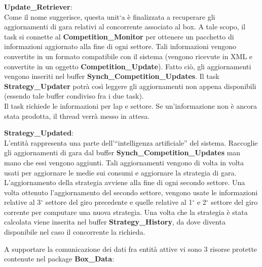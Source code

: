 \begin{description}
\item{\textbf{Update\_Retriever}}:\\
Come il nome suggerisce, questa unit`{a} \`{e} finalizzata a recuperare gli aggiornamenti di gara relativi al concorrente associato al box.
A tale scopo, il task si connette al \textbf{Competition\_Monitor} per ottenere un pacchetto di informazioni aggiornato alla fine di ogni 
settore. Tali informazioni vengono convertite in un formato compatibile con il sistema (vengono ricevute in XML e convertite in un oggetto
\textbf{Competition\_Update}). Fatto ci\`{o}, gli aggiornamenti vengono inseriti nel buffer \textbf{Synch\_Competition\_Updates}. Il task
\textbf{Strategy\_Updater} potr\`{a} cos\`{i} leggere gli aggiornamenti non appena disponibili (essendo tale buffer condiviso fra i due task).\\
Il task richiede le informazioni per lap e settore. Se un'informazione non \`{e} ancora stata prodotta, il thread verr\`{a} messo in attesa.
\item{\textbf{Strategy\_Updated}}:\\
L'entit\`{a} rappresenta una parte dell'``intelligenza artificiale'' del sistema. Raccoglie gli aggiornamenti di gara dal buffer \textbf{Synch\_Competition\_Updates}
man mano che essi vengono aggiunti. Tali aggiornamenti vengono di volta in volta usati per aggiornare le medie sui consumi
e aggiornare la strategia di gara. L'aggiornamento della strategia avviene alla fine di ogni secondo settore.
Una volta ottenuto l'aggiornamento del secondo settore, vengono usate le informazioni relative al 3$^{\circ}$ settore del giro precedente e quelle
relative al 1$^{\circ}$ e 2$^{\circ}$ settore del giro corrente per computare una nuova strategia. Una volta che la strategia \`{e} stata calcolata
viene inserita nel buffer \textbf{Strategy\_History}, da dove diventa disponibile nel caso il concorrente la richieda.
\end{description}
A supportare la comunicazione dei dati fra entit\`{a} attive vi sono 3 risorse protette contenute nel package \textbf{Box\_Data}:
